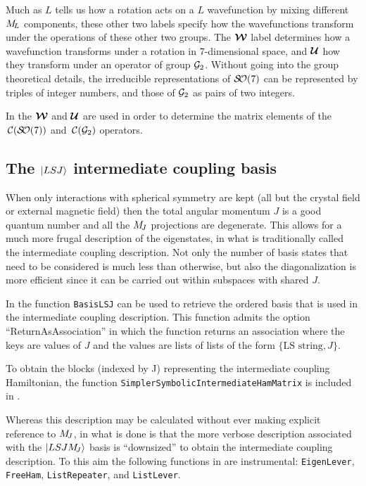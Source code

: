 \documentclass{article}
\newcommand{\codetext}[1]{{\color{BlueViolet} \texttt{#1}}}
\begin{document}
Much as $L$ tells us how a rotation acts on a $L$ wavefunction by mixing different $M_{\!{L}}$ components, these other two labels specify how the wavefunctions transform under the operations of these other two groups. The $\boldsymbol{\mathcal{W}}$ label determines how a wavefunction transforms under a rotation in 7-dimensional space, and $\boldsymbol{\mathcal{U}}$ how they transform under an operator of group $\mathcal{G}_2$. Without going into the group theoretical details, the irreducible representations of $\mathcal{S\!O}(7)$ can be represented by triples of integer numbers, and those of $\mathcal{G}_2$ as pairs of two integers.

In \qlanth the $\boldsymbol{\mathcal{W}}$ and $\boldsymbol{\mathcal{U}}$ are used in order to determine the matrix elements of the $\,\mathcal{C}(\mathcal{S\!O}(7))$ and $\,\mathcal{C}(\mathcal{G}_2)$ operators.

\subsection{The $|LSJ\rangle$ intermediate coupling basis}

When only interactions with spherical symmetry are kept (all but the crystal field or external magnetic field) then the total angular momentum $J$ is a good quantum number and all the $M_{\!{J}}$ projections are degenerate. This allows for a much more frugal description of the eigenstates, in what is traditionally called the intermediate coupling description. Not only the number of basis states that need to be considered is much less than otherwise, but also the diagonalization is more efficient since it can be carried out within subspaces with shared $J$.

In \qlanth the function \codetext{BasisLSJ} can be used to retrieve the ordered basis that is used in the intermediate coupling description. This function admits the option ``ReturnAsAssociation'' in which the function returns an association where the keys are values of $J$ and the values are lists of lists of the form $\{\text{LS string}, J\}$.

To obtain the blocks (indexed by J) representing the intermediate coupling Hamiltonian, the function \codetext{SimplerSymbolicIntermediateHamMatrix} is included in \qlanth.

 

Whereas this description may be calculated without ever making explicit reference to $M_{\!{J}}$, in \qlanth what is done is that the more verbose description associated with the $|LSJM_{\!{J}}\rangle$ basis is ``downsized'' to obtain the intermediate coupling description. To this aim the following functions in \qlanth are instrumental: \codetext{EigenLever}, \codetext{FreeHam}, \codetext{ListRepeater}, and \codetext{ListLever}.
\end{document}
